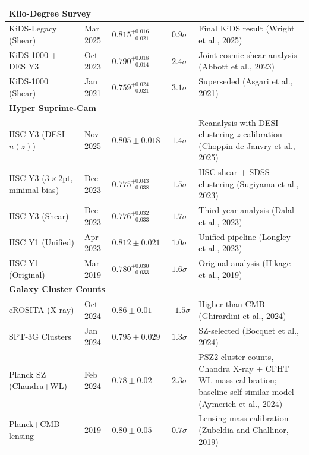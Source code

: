 \documentclass{book}
\begin{document}
\begin{table}[htbp]
\begin{tabularx}{\textwidth}{lll c X}
			\multicolumn{5}{l}{\textbf{Kilo-Degree Survey}} \\ \hline
			KiDS-Legacy (Shear) & Mar 2025 & $0.815_{-0.021}^{+0.016}$ & $0.9\sigma$ & Final KiDS result (Wright et al., 2025) \\
			KiDS-1000 + DES Y3 & Oct 2023 & $0.790_{-0.014}^{+0.018}$ & $2.4\sigma$ & Joint cosmic shear analysis (Abbott et al., 2023) \\
			KiDS-1000 (Shear) & Jan 2021 & $0.759_{-0.021}^{+0.024}$ & $3.1\sigma$ & Superseded (Asgari et al., 2021) \\ \hline
			
			\multicolumn{5}{l}{\textbf{Hyper Suprime-Cam}} \\ \hline
			HSC Y3 (DESI $n(z)$) & Nov 2025 & $0.805 \pm 0.018$ & $1.4\sigma$ & Reanalysis with DESI clustering-$z$ calibration (Choppin de Janvry et al., 2025) \\
			HSC Y3 ($3 \times 2$pt, minimal bias) & Dec 2023 & $0.775_{-0.038}^{+0.043}$ & $1.5\sigma$ & HSC shear + SDSS clustering (Sugiyama et al., 2023) \\
			HSC Y3 (Shear) & Dec 2023 & $0.776_{-0.033}^{+0.032}$ & $1.7\sigma$ & Third-year analysis (Dalal et al., 2023) \\
			HSC Y1 (Unified) & Apr 2023 & $0.812 \pm 0.021$ & $1.0\sigma$ & Unified pipeline (Longley et al., 2023) \\
			HSC Y1 (Original) & Mar 2019 & $0.780_{-0.033}^{+0.030}$ & $1.6\sigma$ & Original analysis (Hikage et al., 2019) \\ \hline
			
			\multicolumn{5}{l}{\textbf{Galaxy Cluster Counts}} \\ \hline
			eROSITA (X-ray) & Oct 2024 & $0.86 \pm 0.01$ & $-1.5\sigma$ & Higher than CMB (Ghirardini et al., 2024) \\
			SPT-3G Clusters & Jan 2024 & $0.795 \pm 0.029$ & $1.3\sigma$ & SZ-selected (Bocquet et al., 2024) \\
			Planck SZ (Chandra+WL) & Feb 2024 & $0.78 \pm 0.02$ & $2.3\sigma$ & PSZ2 cluster counts, Chandra X-ray + CFHT WL mass calibration; baseline self-similar model (Aymerich et al., 2024) \\
			Planck+CMB lensing & 2019 & $0.80 \pm 0.05$ & $0.7\sigma$ & Lensing mass calibration (Zubeldia and Challinor, 2019) \\ \hline
			

\end{tabularx}
\end{table}
\end{document}
